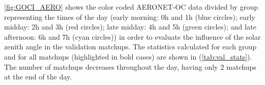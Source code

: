 \documentclass[onecolumn,3p,letterpaper,11pt]{elsarticle}
\begin{document}
\autoref{fig:GOCI_AERO} shows the color coded AERONET-OC data divided by group representing the times of the day (early morning: 0h and 1h (blue circles); early midday: 2h and 3h (red circles); late midday: 4h and 5h (green circles); and late afternoon: 6h and 7h (cyan circles)) in order to evaluate the influence of the solar zenith angle in the validation matchups. The statistics calculated for each group and for all matchups (highlighted in bold cases) are shown in (\autoref{tab:val_stats}). The number of matchups decreases throughout the day, having only 2 matchups at the end of the day.

\end{document}
